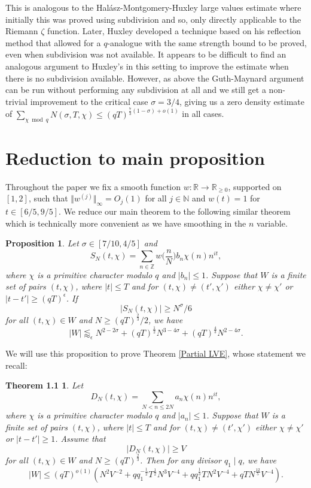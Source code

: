 \documentclass[12pt]{amsart}
\newtheorem{proposition}[theorem]{Proposition}
\theoremstyle{definition}
\theoremstyle{plain}
\newtheorem*{theoremrestated}{Theorem 1.1}
\theoremstyle{remark}
\numberwithin{equation}{section}
\numberwithin{theorem}{section}
\numberwithin{equation}{section}
\begin{document}
	This is analogous to the Halász-Montgomery-Huxley large values estimate \cite{Huxley1972} where initially this was proved using subdivision and so, only directly applicable to the Riemann $\zeta$ function. Later, Huxley \cite{Huxley1975} developed a technique based on his reflection method that allowed for a $q$-analogue with the same strength bound to be proved, even when subdivision was not available. It appears to be difficult to find an analogous argument to Huxley's in this setting to improve the estimate when there is no subdivision available. However, as above the Guth-Maynard argument can be run without performing any subdivision at all and we still get a non-trivial improvement to the critical case $\sigma = 3/4$, giving us a zero density estimate of $\sum_{\chi \bmod q}N(\sigma,T,\chi) \leq (qT)^{\frac{7}{3}(1-\sigma)+o(1)}$ in all cases.
	
	\section{Reduction to main proposition}\label{remp}
	Throughout the paper we fix a smooth function $w: \mathbb{R} \rightarrow \mathbb{R}_{\geq 0}$, supported on $[1, 2]$, such that $\Vert w^{(j)} \Vert_{\infty}=O_{j}(1)$ for all $j \in \mathbb{N}$ and $w(t)=1$ for $t \in [6/5, 9/5]$. We reduce our main theorem to the following similar theorem which is technically more convenient as we have smoothing in the $n$ variable.
	\begin{proposition}\label{Auxiliary theorem}
		Let $\sigma \in [7/10, 4/5]$ and 
		\[S_{N}(t, \chi)=\sum_{n \in \mathbb{Z}} w\bigg(\frac{n}{N}\bigg)b_{n}\chi(n)n^{it},\]
		where $\chi$ is a primitive character modulo $q$ and $|b_{n}| \leq1$. Suppose that $W$ is a finite set of pairs $(t, \chi)$,  where $|t| \leq T$ and for $(t, \chi)\neq (t', \chi')$ either $\chi \neq \chi'$ or $|t-t'|\geq (qT)^{\epsilon}$. If
		\[ |S_{N}(t, \chi)| \geq N^{\sigma}/6
		\]
		for all $(t, \chi) \in W$ and $N \geq (qT)^{\frac{2}{3}}/2$,
		we have
		\[ |W| \lessapprox_{\epsilon} N^{2-2\sigma}+ (qT)^{\frac{1}{2}}N^{3-4\sigma}+(qT)^{\frac{4}{3}}N^{2-4\sigma}.
		\]
	\end{proposition} 
	
	We will use this proposition to prove Theorem \ref{Partial LVE}, whose statement we recall:
	\begin{theoremrestated}
		Let
		\[
		D_{N}(t, \chi)=\sum_{N < n \leq 2N} a_{n}\chi(n)n^{it},
		\]
		where $\chi$ is a primitive character modulo $q$ and $|a_{n}| \leq1$.
		Suppose that $W$ is a finite set of pairs $(t, \chi)$, where $|t| \leq T$
		and for $(t, \chi)\neq (t', \chi')$ either $\chi \neq \chi'$ or
		$|t-t'|\geq 1$. Assume that
		\[
		|D_{N}(t, \chi)| \geq V
		\]
		for all $(t, \chi) \in W$ and $N \geq(qT)^{\frac{2}{3}}$.
		Then for any divisor $q_1 \mid q$, we have
		\[
		|W| \leq (qT)^{o(1)}
		(
		N^{2}V^{-2}
		+ qq_1^{-\frac{1}{2}}T^{\frac{1}{2}}N^{3}V^{-4}
		+ q q_1^{\frac{1}{3}}TN^{2}V^{-4}
		+ qTN^{\frac{12}{5}}V^{-4}
		).
		\]
	\end{theoremrestated}
	
\end{document}
